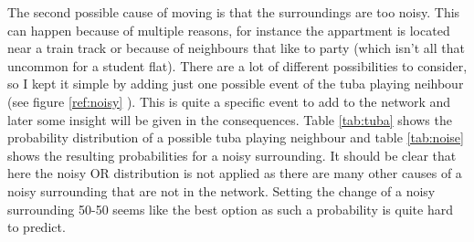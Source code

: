 \documentclass[12pt]{article} %
\begin{document}
The second possible cause of moving is that the surroundings are too noisy. This
can happen because of multiple reasons, for instance the appartment is
located near a train track or because of neighbours that like to party (which
isn't all that uncommon for a student flat). There are a lot of
different possibilities to consider, so I kept it simple by adding just one possible event
of the tuba playing neihbour (see figure \ref{ref:noisy} ). This is quite a specific event to add to the
network and later some insight will be given in the consequences. Table
\ref{tab:tuba} shows the probability distribution of a possible tuba playing
neighbour and table \ref{tab:noise} shows the resulting probabilities for a
noisy surrounding. It should be clear that here the noisy OR distribution is not
applied as there are many other causes of a noisy surrounding that are not in
the network. Setting the change of a noisy surrounding 50-50 seems like the best
option as such a probability is quite hard to predict.

    \begin{table}
\centering
{}
\end{table}


\end{document}
